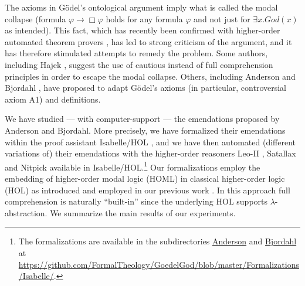 \documentclass{birkjour}
\theoremstyle{definition}
\theoremstyle{remark}
\numberwithin{equation}{section}
\begin{document}

\maketitle


The axioms in G\"odel's ontological argument
\cite{GoedelNotes,ScottNotes} imply what is called the modal collapse
\cite{Sobel1987,SobelBook} (formula $\varphi \rightarrow \Box \varphi$
holds for any formula $\varphi$ and not just for $\exists x. God(x)$
as intended). This fact, which has recently been confirmed with
higher-order automated theorem provers \cite{J30,ECAI-2014}, has led
to strong criticism of the argument, and it has therefore stimulated
attempts to remedy the problem. Some authors, including Hajek
\cite{Hajek_der_Mathematiker,Hajek_Magari_and_others}, suggest the use
of cautious instead of full comprehension principles in order to
escape the modal collapse. Others, including Anderson
\cite{anderson90:_some_emend_of_goedel_ontol_proof,AndersonGettings}
and Bjordahl \cite{}, have proposed  to adapt G\"odel's axioms (in
particular, controversial axiom A1) and definitions.

We have studied --- with computer-support --- the emendations proposed
by Anderson and Bjordahl.  More precisely, we have formalized their
emendations within the proof assistant Isabelle/HOL \cite{Isabelle},
and we have then automated (different variations of) their
emendations with the higher-order reasoners Leo-II \cite{}, Satallax
\cite{} and Nitpick \cite{} available in Isabelle/HOL.\footnote{The
  formalizations are available in the subdirectories \url{Anderson}
  and \url{Bjordahl} at
  \url{https://github.com/FormalTheology/GoedelGod/blob/master/Formalizations/Isabelle/}.}
Our formalizations employ the embedding of higher-order modal logic
(HOML) in classical higher-order logic (HOL) as introduced and
employed in our previous work \cite{J30,ECAI-2014}. In this approach
full comprehension is naturally ``built-in'' since the underlying HOL
supports $\lambda$-abstraction. We summarize the main results of our
experiments.
\end{document}
